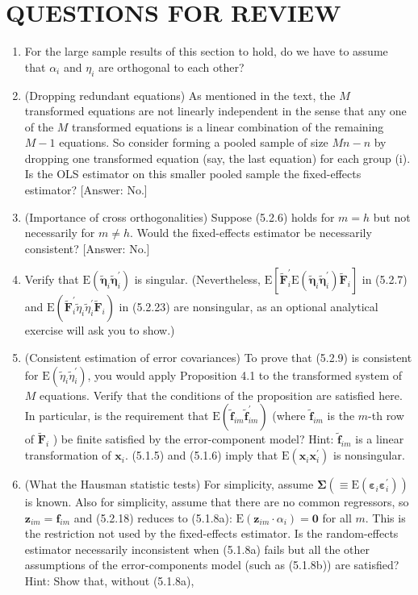 \documentclass[10pt]{article}
\begin{document}
\section*{QUESTIONS FOR REVIEW}
\begin{enumerate}
  \item For the large sample results of this section to hold, do we have to assume that $\alpha_{i}$ and $\eta_{i}$ are orthogonal to each other?
  \item (Dropping redundant equations) As mentioned in the text, the $M$ transformed equations are not linearly independent in the sense that any one of the $M$ transformed equations is a linear combination of the remaining $M-1$ equations. So consider forming a pooled sample of size $M n-n$ by dropping one transformed equation (say, the last equation) for each group (i). Is the OLS estimator on this smaller pooled sample the fixed-effects estimator? [Answer: No.]
  \item (Importance of cross orthogonalities) Suppose (5.2.6) holds for $m=h$ but not necessarily for $m \neq h$. Would the fixed-effects estimator be necessarily consistent? [Answer: No.]
  \item Verify that $\mathrm{E}\left(\tilde{\boldsymbol{\eta}}_{i} \tilde{\boldsymbol{\eta}}_{i}^{\prime}\right)$ is singular. (Nevertheless, $\mathrm{E}\left[\widetilde{\mathbf{F}}_{i}^{\prime} \mathrm{E}\left(\tilde{\boldsymbol{\eta}}_{i} \tilde{\boldsymbol{\eta}}_{i}^{\prime}\right) \widetilde{\mathbf{F}}_{i}\right]$ in (5.2.7) and $\mathrm{E}\left(\widetilde{\mathbf{F}}_{i}^{\prime} \tilde{\eta}_{i} \tilde{\eta}_{i}^{\prime} \widetilde{\mathbf{F}}_{i}\right)$ in (5.2.23) are nonsingular, as an optional analytical exercise will ask you to show.)
  \item (Consistent estimation of error covariances) To prove that (5.2.9) is consistent for $\mathrm{E}\left(\tilde{\eta}_{i} \tilde{\eta}_{i}^{\prime}\right)$, you would apply Proposition 4.1 to the transformed system of $M$ equations. Verify that the conditions of the proposition are satisfied here. In particular, is the requirement that $\mathrm{E}\left(\tilde{\mathbf{f}}_{i m} \tilde{\mathbf{f}}_{i m}^{\prime}\right)$ (where $\tilde{\mathbf{f}}_{i m}$ is the $m$-th row of $\widetilde{\mathbf{F}}_{i}$ ) be finite satisfied by the error-component model? Hint: $\tilde{\mathbf{f}}_{i m}$ is a linear transformation of $\mathbf{x}_{i}$. (5.1.5) and (5.1.6) imply that $\mathrm{E}\left(\mathbf{x}_{i} \mathbf{x}_{i}^{\prime}\right)$ is nonsingular.
  \item (What the Hausman statistic tests) For simplicity, assume $\boldsymbol{\Sigma}\left(\equiv \mathrm{E}\left(\boldsymbol{\varepsilon}_{i} \boldsymbol{\varepsilon}_{i}^{\prime}\right)\right)$ is known. Also for simplicity, assume that there are no common regressors, so $\mathbf{z}_{i m}=\mathbf{f}_{i m}$ and (5.2.18) reduces to (5.1.8a): $\mathrm{E}\left(\mathbf{z}_{i m} \cdot \alpha_{i}\right)=\mathbf{0}$ for all $m$. This is the restriction not used by the fixed-effects estimator. Is the random-effects estimator necessarily inconsistent when (5.1.8a) fails but all the other assumptions of the error-components model (such as (5.1.8b)) are satisfied? Hint: Show that, without (5.1.8a),
\end{enumerate}
\end{document}
